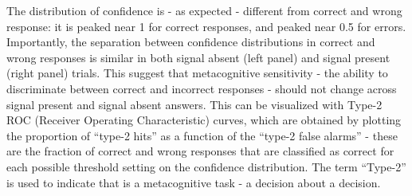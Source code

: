 \documentclass[
]{book}
\begin{document}
The distribution of confidence is - as expected - different from correct and wrong response: it is peaked near 1 for correct responses, and peaked near 0.5 for errors. Importantly, the separation between confidence distributions in correct and wrong responses is similar in both signal absent (left panel) and signal present (right panel) trials. This suggest that metacognitive sensitivity - the ability to discriminate between correct and incorrect responses - should not change across signal present and signal absent answers. This can be visualized with Type-2 ROC (Receiver Operating Characteristic) curves, which are obtained by plotting the proportion of ``type-2 hits'' as a function of the ``type-2 false alarms'' - these are the fraction of correct and wrong responses that are classified as correct for each possible
threshold setting on the confidence distribution. The term ``Type-2'' is used to indicate that is a metacognitive task - a decision about a decision\citep{Galvin2003}.
\end{document}

